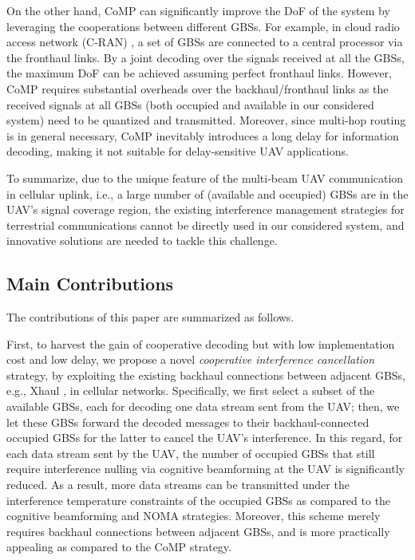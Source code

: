 \documentclass[onecolumn, draftclsnofoot, 12pt]{IEEEtran}
\begin{document}
On the other hand, CoMP can significantly improve the DoF of the system by leveraging the cooperations between different GBSs. For example, in cloud radio access network (C-RAN) \cite{CRAN,Liang15}, a set of GBSs are connected to a central processor via the fronthaul links. By a joint decoding over the signals received at all the GBSs, the maximum DoF can be achieved assuming perfect fronthaul links. However, CoMP requires substantial overheads over the backhaul/fronthaul links as the received signals at all GBSs (both occupied and available in our considered system) need to be quantized and transmitted. Moreover, since multi-hop routing is in general necessary, CoMP inevitably introduces a long delay for information decoding, making it not suitable for delay-sensitive UAV applications.

To summarize, due to the unique feature of the multi-beam UAV communication in cellular uplink, i.e., a large number of (available and occupied) GBSs are in the UAV's signal coverage region, the existing interference management strategies for terrestrial communications cannot be directly used in our considered system, and innovative solutions are needed to tackle this challenge.

\subsection{Main Contributions}
The contributions of this paper are summarized as follows.

First, to harvest the gain of cooperative decoding but with low implementation cost and low delay, we propose a novel \emph{cooperative interference cancellation} strategy, by exploiting the existing backhaul connections between adjacent GBSs, e.g., Xhaul \cite{Xhaul}, in cellular networks. Specifically, we first select a subset of the available GBSs, each for decoding one data stream sent from the UAV; then, we let these GBSs forward the decoded messages to their backhaul-connected occupied GBSs for the latter to cancel the UAV's interference. In this regard, for each data stream sent by the UAV, the number of occupied GBSs that still require interference nulling via cognitive beamforming at the UAV is significantly reduced. As a result, more data streams can be transmitted under the interference temperature constraints of the occupied GBSs as compared to the cognitive beamforming and NOMA strategies. Moreover, this scheme merely requires backhaul connections between adjacent GBSs, and is more practically appealing as compared to the CoMP strategy.
\end{document}

